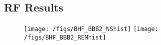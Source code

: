 \subsection{RF Results}

\begin{figure}
\centering
\texttt{[image: /figs/BHF\_BBB2\_NShist]}
\texttt{[image: /figs/BHF\_BBB2\_REMhist]}
\caption{\label{fig:RF_hist_BHFBBB2}}
\end{figure}
